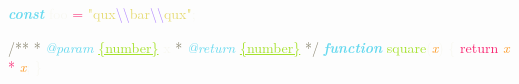 \textbf{\textit{\textcolor[HTML]{66d9ef}{const}}}\textcolor[HTML]{f8f8f2}{ }\textcolor[HTML]{f8f8f2}{foo}\textcolor[HTML]{f8f8f2}{ }\textcolor[HTML]{f92672}{=}\textcolor[HTML]{f8f8f2}{ }\textcolor[HTML]{e6db74}{"qux}\textcolor[HTML]{ae81ff}{\textbackslash{}\textbackslash{}}\textcolor[HTML]{e6db74}{bar}\textcolor[HTML]{ae81ff}{\textbackslash{}\textbackslash{}}\textcolor[HTML]{e6db74}{qux"}\textcolor[HTML]{f8f8f2}{;}

\textcolor[HTML]{88846f}{/**}
\textcolor[HTML]{88846f}{ * }\textit{\textcolor[HTML]{66d9ef}{@param}}\textcolor[HTML]{88846f}{ }\textcolor[HTML]{a6e22e}{\uline{\{number\}}}\textcolor[HTML]{88846f}{ }\textcolor[HTML]{f8f8f2}{x}
\textcolor[HTML]{88846f}{ * }\textit{\textcolor[HTML]{66d9ef}{@return}}\textcolor[HTML]{88846f}{ }\textcolor[HTML]{a6e22e}{\uline{\{number\}}}
\textcolor[HTML]{88846f}{ */}
\textbf{\textit{\textcolor[HTML]{66d9ef}{function}}}\textcolor[HTML]{f8f8f2}{ }\textcolor[HTML]{a6e22e}{square}\textcolor[HTML]{f8f8f2}{(}\textit{\textcolor[HTML]{fd971f}{x}}\textcolor[HTML]{f8f8f2}{) \{}
\textcolor[HTML]{f8f8f2}{  }\textcolor[HTML]{f92672}{return}\textcolor[HTML]{f8f8f2}{ }\textit{\textcolor[HTML]{fd971f}{x}}\textcolor[HTML]{f8f8f2}{ }\textcolor[HTML]{f92672}{*}\textcolor[HTML]{f8f8f2}{ }\textit{\textcolor[HTML]{fd971f}{x}}\textcolor[HTML]{f8f8f2}{;}
\textcolor[HTML]{f8f8f2}{\}}

